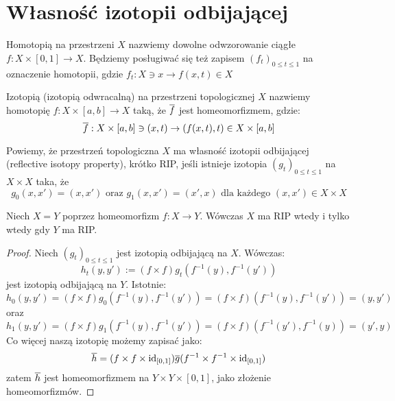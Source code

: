 \section{Własność izotopii odbijającej}

\begin{df}
  Homotopią na przestrzeni $X$ nazwiemy dowolne odwzorowanie ciągłe $f: X \times [0,1] \rightarrow X$. Będziemy posługiwać się też zapisem $(f_t)_{0 \leq t \leq 1}$ na oznaczenie homotopii, gdzie $f_t: X \ni x \rightarrow f(x,t) \in X$
\end{df}


\begin{df}
  Izotopią (izotopią odwracalną) na przestrzeni topologicznej $X$ nazwiemy homotopię $f: X \times [a, b] \rightarrow X$ taką, że $\overline{f}$ jest homeomorfizmem, gdzie:
  $$\overline{f}: X \times [a,b] \ni (x, t) \rightarrow (f(x, t), t) \in X \times [a,b]$$
\end{df}

\begin{df}
  Powiemy, że przestrzeń topologiczna $X$ ma własność izotopii odbijającej (reflective isotopy property), krótko RIP, jeśli istnieje izotopia $(g_t)_{0 \leq t \leq 1}$ na $X \times X$ taka, że
  $$g_0(x, x') = (x, x') \mbox{ oraz } g_1(x, x') = (x', x) \mbox{ dla każdego } (x, x') \in X \times X$$
\end{df}

\begin{ex}
  Niech $X = Y$ poprzez homeomorfizm $f: X \rightarrow Y$. Wówczas $X$ ma RIP wtedy i tylko wtedy gdy $Y$ ma RIP.
  \begin{proof}
    Niech $(g_t)_{0 \leq t \leq 1}$ jest izotopią odbijającą na $X$. Wówczas:
    $$h_t(y, y') := (f \times f) g_t(f^{-1}(y), f^{-1}(y'))$$
    jest izotopią odbijającą na $Y$. Istotnie:
    $$h_0(y,y') = (f \times f) g_0(f^{-1}(y), f^{-1}(y')) = (f \times f)(f^{-1}(y), f^{-1}(y')) = (y, y')$$
    oraz
    $$h_1(y,y') = (f \times f) g_1(f^{-1}(y), f^{-1}(y')) = (f \times f)(f^{-1}(y'), f^{-1}(y)) = (y', y)$$
    Co więcej naszą izotopię możemy zapisać jako:
    $$\overline{h} = (f \times f \times \mbox{id}_{[0,1]}) \overline{g} (f^{-1} \times f^{-1} \times \mbox{id}_{[0,1]})$$
    zatem $\overline{h}$ jest homeomorfizmem na $Y \times Y \times [0,1]$, jako złożenie homeomorfizmów.
  \end{proof}
\end{ex}


